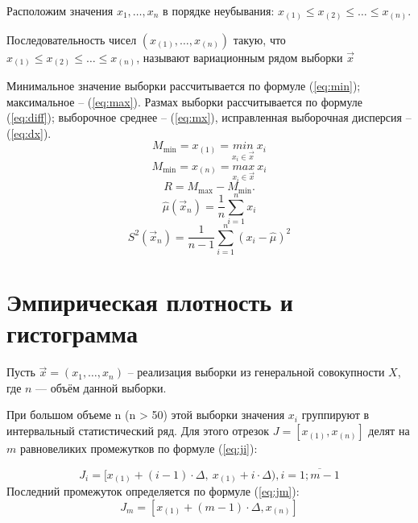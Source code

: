 Расположим значения $x_1, \dots, x_n$ в порядке неубывания:  $x_{(1)} \leq x_{(2)} \leq \dots \leq x_{(n)}$.

Последовательность чисел $(x_{(1)}, \dots, x_{(n)})$ такую, что $x_{(1)} \leq x_{(2)} \leq \dots \leq x_{(n)}$, называют вариационным рядом выборки $\vec{x}$


Минимальное значение выборки рассчитывается по формуле (\ref{eq:min}); максимальное -- (\ref{eq:max}). Размах выборки рассчитывается по формуле (\ref{eq:diff}); выборочное среднее -- (\ref{eq:mx}), исправленная выборочная дисперсия -- (\ref{eq:dx}).
\begin{equation}
	\label{eq:min}
	M_{\min} = x_{(1)} = \underset{x_i \in \vec{x}}{min}~x_i
\end{equation}
\begin{equation}
	\label{eq:max}
	M_{\min} = x_{(n)} =  \underset{x_i \in \vec{x}}{max}~x_i
\end{equation}
\begin{equation}
	\label{eq:diff}
	R = M_{\max} - M_{\min}.
\end{equation}
\begin{equation}
	\label{eq:mx}
	\hat\mu(\vec x_n) = \frac 1n \sum_{i=1}^n x_i
\end{equation}
\begin{equation}
	\label{eq:dx}
	S^2(\vec x_n) = \frac 1{n - 1} \sum_{i=1}^n (x_i - \hat\mu)^2
\end{equation}

\section{Эмпирическая плотность и гистограмма}
Пусть $\vec{x} = (x_1, \dots, x_n)$ -- реализация выборки из генеральной совокупности $X$, где $n$ --- объём данной выборки.

При большом объеме n (n > 50) этой выборки  значения $x_i$ группируют в интервальный статистический ряд. Для этого отрезок $J = [x_{(1)}, x_{(n)}]$ делят на $m$ равновеликих промежутков по формуле (\ref{eq:ji}):

\begin{equation}
	\label{eq:ji}
	J_i = [x_{(1)} + (i - 1) \cdot \Delta,\ x_{(1)} + i \cdot \Delta), i = \overline{1; m - 1}
\end{equation}
Последний промежуток определяется по формуле (\ref{eq:jm}):
\begin{equation}
	\label{eq:jm}
	J_{m} = [x_{(1)} + (m - 1) \cdot \Delta, x_{(n)}]
\end{equation}

